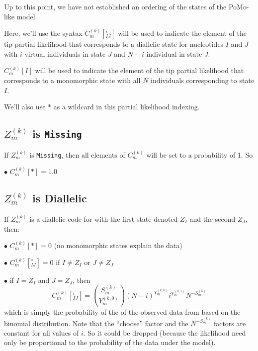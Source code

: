 \documentclass{llncs}
\newcommand{\virtPopSize}{\ensuremath{N}}
\newcommand{\pomo}{PoMo\xspace}
\begin{document}
Up to this point, we have not established an ordering of the states of the \pomo-like model.

Here, we'll use the syntax $C_m^{(k)}[^{i}_{IJ}]$ will be used to indicate the element of 
    the tip partial likelihood that corresponds to a diallelic state for nucleotides $I$ and $J$
    with $i$ virtual individuals in state $J$ and $N-i$ individual in state $J$.

$C_m^{(k)}[I]$ will be used to indicate the element of 
    the tip partial likelihood that corresponds to a monomorphic state with all $\virtPopSize$
    individuals corresponding to state $I$.

We'll also use $\ast$ as a wildcard in this partial likelihood indexing.

\subsection*{$Z_m^{(k)}$ is \texttt{Missing}}
If $Z_m^{(k)}$ is \texttt{Missing}, then all elements of $C_m^{(k)}$ will be set to a probability of 1. So
\begin{compactitem}
    \item[$\bullet$] $C_m^{(k)}[\ast]=1.0$
\end{compactitem}

\subsection*{$Z_m^{(k)}$ is Diallelic}
If $Z_m^{(k)}$ is a diallelic code for with the first state denoted $Z_I$ and the second $Z_J$, then:
\begin{compactitem}
    \item[$\bullet$] $C_m^{(k)}[*] = 0$  (no monomorphic states explain the data)
    \item[$\bullet$] $C_m^{(k)}[^{\ast}_{IJ}] = 0$  if $I\neq Z_I$ or $J\neq Z_J$
    \item[$\bullet$] if $I = Z_I$ and $J = Z_J$, then
     $$C_m^{(k)}[^{i}_{IJ}] = {S_m^{(k)} \choose Y_m^{(k,0)}} (\virtPopSize - i)^{Y_m^{(k,0)}}i^{Y_m^{(k,1)}} \virtPopSize^{-S_m^{(k)}}$$
     which is simply the probability of the of the observed data from based on the binomial distribution.
     Note that the ``choose'' factor and the $ \virtPopSize^{-S_m^{(k)}}$ factors are constant for all values of $i$. So it could be dropped (because the likelihood need only be proportional to the probability of the data under the model).
\end{compactitem}
\end{document}
